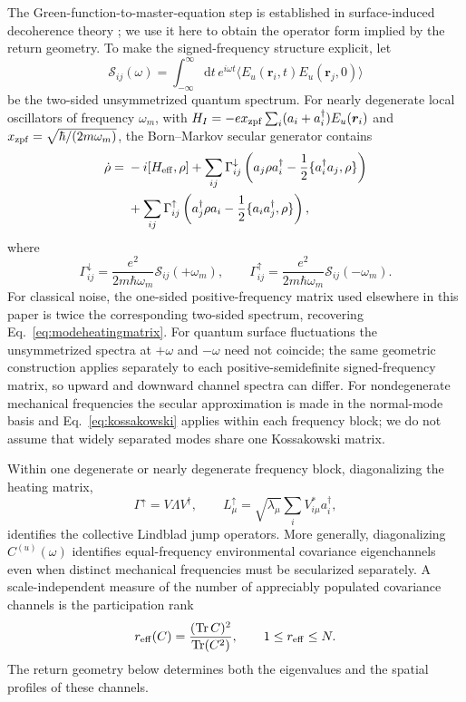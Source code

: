 \documentclass[aps,pra,twocolumn,superscriptaddress,longbibliography,nofootinbib,floatfix]{revtex4-2}
\theoremstyle{remark}
\newcommand{\dd}{\mathrm d}
\begin{document}
The Green-function-to-master-equation step is established in surface-induced decoherence theory \cite{Martinetz2022}; we use it here to obtain the operator form implied by the return geometry.  To make the signed-frequency structure explicit, let
\begin{equation}
\mathcal S_{ij}(\omega)=\int_{-\infty}^{\infty}\dd t\,e^{i\omega t}
\langle E_u(\bm r_i,t)E_u(\bm r_j,0)\rangle
\end{equation}
be the two-sided unsymmetrized quantum spectrum.  For nearly degenerate local oscillators of frequency $\omega_m$, with $H_I=-e x_{\rm zpf}\sum_i(a_i+a_i^\dagger)E_u(\bm r_i)$ and $x_{\rm zpf}=\sqrt{\hbar/(2m\omega_m)}$, the Born--Markov secular generator contains
\begin{align}
\dot\rho={}&-i[H_{\rm eff},\rho]
+\sum_{ij}\Gamma^\downarrow_{ij}\left(a_j\rho a_i^\dagger-\frac12\{a_i^\dagger a_j,\rho\}\right)\nonumber\\
&+\sum_{ij}\Gamma^\uparrow_{ij}\left(a_j^\dagger\rho a_i-\frac12\{a_i a_j^\dagger,\rho\}\right),
\label{eq:kossakowski}
\end{align}
where
\begin{equation}
\Gamma^\downarrow_{ij}=\frac{e^2}{2m\hbar\omega_m}\mathcal S_{ij}(+\omega_m),
\qquad
\Gamma^\uparrow_{ij}=\frac{e^2}{2m\hbar\omega_m}\mathcal S_{ij}(-\omega_m).
\label{eq:ratesigned}
\end{equation}
For classical noise, the one-sided positive-frequency matrix used elsewhere in this paper is twice the corresponding two-sided spectrum, recovering Eq.~\eqref{eq:modeheatingmatrix}.  For quantum surface fluctuations the unsymmetrized spectra at $+\omega$ and $-\omega$ need not coincide; the same geometric construction applies separately to each positive-semidefinite signed-frequency matrix, so upward and downward channel spectra can differ.  For nondegenerate mechanical frequencies the secular approximation is made in the normal-mode basis and Eq.~\eqref{eq:kossakowski} applies within each frequency block; we do not assume that widely separated modes share one Kossakowski matrix.

Within one degenerate or nearly degenerate frequency block, diagonalizing the heating matrix,
\begin{equation}
\Gamma^\uparrow=V\Lambda V^\dagger,
\qquad
L_\mu^\uparrow=\sqrt{\lambda_\mu}\sum_iV^*_{i\mu}a_i^\dagger,
\label{eq:jumps}
\end{equation}
identifies the collective Lindblad jump operators.  More generally, diagonalizing $C^{(u)}(\omega)$ identifies equal-frequency environmental covariance eigenchannels even when distinct mechanical frequencies must be secularized separately.  A scale-independent measure of the number of appreciably populated covariance channels is the participation rank
\begin{equation}
r_{\rm eff}(C)=\frac{(\operatorname{Tr}C)^2}{\operatorname{Tr}(C^2)},
\qquad 1\le r_{\rm eff}\le N.
\label{eq:reffC}
\end{equation}
The return geometry below determines both the eigenvalues and the spatial profiles of these channels.
\end{document}
